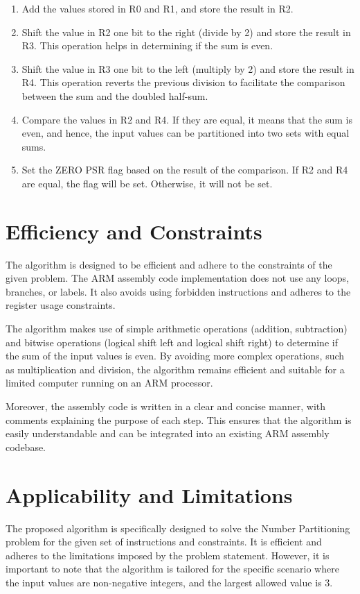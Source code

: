 \begin{enumerate}
    \item Add the values stored in R0 and R1, and store the result in R2.
    \item Shift the value in R2 one bit to the right (divide by 2) and store the result in R3. This operation helps in determining if the sum is even.
    \item Shift the value in R3 one bit to the left (multiply by 2) and store the result in R4. This operation reverts the previous division to facilitate the comparison between the sum and the doubled half-sum.
    \item Compare the values in R2 and R4. If they are equal, it means that the sum is even, and hence, the input values can be partitioned into two sets with equal sums.
    \item Set the ZERO PSR flag based on the result of the comparison. If R2 and R4 are equal, the flag will be set. Otherwise, it will not be set.
\end{enumerate}

\section{Efficiency and Constraints}
The algorithm is designed to be efficient and adhere to the constraints of the given problem. The ARM assembly code implementation does not use any loops, branches, or labels. It also avoids using forbidden instructions and adheres to the register usage constraints.

The algorithm makes use of simple arithmetic operations (addition, subtraction) and bitwise operations (logical shift left and logical shift right) to determine if the sum of the input values is even. By avoiding more complex operations, such as multiplication and division, the algorithm remains efficient and suitable for a limited computer running on an ARM processor.

Moreover, the assembly code is written in a clear and concise manner, with comments explaining the purpose of each step. This ensures that the algorithm is easily understandable and can be integrated into an existing ARM assembly codebase.

\section{Applicability and Limitations}
The proposed algorithm is specifically designed to solve the Number Partitioning problem for the given set of instructions and constraints. It is efficient and adheres to the limitations imposed by the problem statement. However, it is important to note that the algorithm is tailored for the specific scenario where the input values are non-negative integers, and the largest allowed value is 3.

